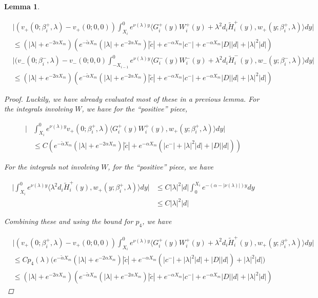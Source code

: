 \documentclass[12pt]{article}
\newtheorem{lemma}{Lemma}
\begin{document}
\begin{lemma}\label{centerint}

\begin{align*}
&\Big| (v_+(0; \beta_i^+, \lambda) - v_+(0; 0, 0)) \int_{X_i}^0 e^{\nu(\lambda)y}  \langle G_i^+(y)W_i^+(y) + \lambda^2 d_i \tilde{H}_i^+(y), w_+(y; \beta_i^+, \lambda) \rangle dy \Big| \\
&\leq (|\lambda| + e^{-2 \alpha X_m})( e^{-\tilde{\alpha} X_m } (|\lambda| + e^{-2 \alpha X_m}) |\tilde{c}| + e^{-\alpha X_m} |c^-| + e^{-\alpha X_m} |D| |d| + |\lambda|^2 |d| ) \\
&\Big| (v_-(0; \beta_i^-, \lambda) - v_-(0; 0, 0) \int_{-X_{i-1}}^0
e^{\nu(\lambda)y} \langle G_i^-(y)W_i^-(y) + \lambda^2 d_i \tilde{H}_i^-(y), w_-(y; \beta_i^-, \lambda) \rangle dy \Big| \\
&\leq (|\lambda| + e^{-2 \alpha X_m})( e^{-\tilde{\alpha} X_m } (|\lambda| + e^{-2 \alpha X_m}) |\tilde{c}| + e^{-\alpha X_m} |c^-| + e^{-\alpha X_m} |D| |d| + |\lambda|^2 |d| )
\end{align*}

\begin{proof}

Luckily, we have already evaluated most of these in a previous lemma. For the integrals involving $W$, we have for the ``positive'' piece,

\begin{align*}
\Big| &\int_{X_i}^0 e^{\nu(\lambda)y} v_+(0; \beta_i^+, \lambda) \langle G_i^+(y)W_i^+(y), w_+(y; \beta_i^+, \lambda) \rangle dy \Big| \\
&\leq C ( e^{-\tilde{\alpha} X_m } (|\lambda| + e^{-2 \alpha X_m}) |\tilde{c}| + e^{-\alpha X_m} ( |c^-| + |\lambda|^2|d| + |D| |d| ))
\end{align*}

For the integrals not involving $W$, for the ``positive'' piece, we have

\begin{align*}
\Big| \int_{X_i}^0 e^{\nu(\lambda)y} \langle \lambda^2 d_i \tilde{H}_i^+(y), w_+(y; \beta_i^+, \lambda) \rangle dy \Big| &\leq C |\lambda|^2 |d| \int_0^{X_i} e^{-(\alpha - |\nu(\lambda)|)y} dy \\
&\leq C |\lambda|^2 |d|
\end{align*}

Combining these and using the bound for $p_4$, we have

\begin{align*}
&\Big| (v_+(0; \beta_i^+, \lambda) - v_+(0; 0, 0)) \int_{X_i}^0 e^{\nu(\lambda)y}  \langle G_i^+(y)W_i^+(y) + \lambda^2 d_i \tilde{H}_i^+(y), w_+(y; \beta_i^+, \lambda) \rangle dy \Big| \\
&\leq C p_4(\lambda) \Big( e^{-\tilde{\alpha} X_m } (|\lambda| + e^{-2 \alpha X_m}) |\tilde{c}| + e^{-\alpha X_m} ( |c^-| + |\lambda|^2|d| + |D| |d| ) + |\lambda|^2 |d| \Big) \\
&\leq (|\lambda| + e^{-2 \alpha X_m})( e^{-\tilde{\alpha} X_m } (|\lambda| + e^{-2 \alpha X_m}) |\tilde{c}| + e^{-\alpha X_m} |c^-| + e^{-\alpha X_m} |D| |d| + |\lambda|^2 |d| )
\end{align*}

\end{proof}
\end{lemma}
\end{document}
